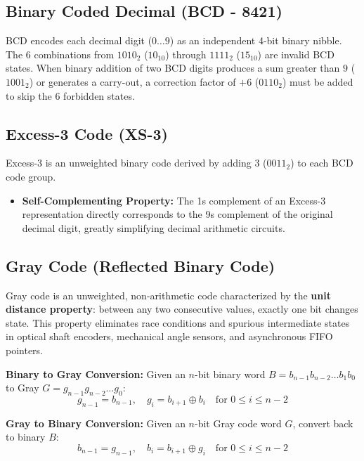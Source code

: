 \subsection{Binary Coded Decimal (BCD - 8421)}
BCD encodes each decimal digit ($0 \dots 9$) as an independent 4-bit binary nibble.
The 6 combinations from $1010_2$ ($10_{10}$) through $1111_2$ ($15_{10}$) are invalid BCD states.
When binary addition of two BCD digits produces a sum greater than $9$ ($1001_2$) or generates a carry-out, a correction factor of $+6$ ($0110_2$) must be added to skip the 6 forbidden states.

\subsection{Excess-3 Code (XS-3)}
Excess-3 is an unweighted binary code derived by adding $3$ ($0011_2$) to each BCD code group.
\begin{itemize}
    \item \textbf{Self-Complementing Property:} The 1\textquotesingle s complement of an Excess-3 representation directly corresponds to the 9\textquotesingle s complement of the original decimal digit, greatly simplifying decimal arithmetic circuits.
\end{itemize}

\subsection{Gray Code (Reflected Binary Code)}
Gray code is an unweighted, non-arithmetic code characterized by the \textbf{unit distance property}: between any two consecutive values, exactly one bit changes state. This property eliminates race conditions and spurious intermediate states in optical shaft encoders, mechanical angle sensors, and asynchronous FIFO pointers.

\begin{derivationbox}
\textbf{Binary to Gray Conversion:}
Given an $n$-bit binary word $B = b_{n-1} b_{n-2} \dots b_1 b_0$ to Gray $G = g_{n-1} g_{n-2} \dots g_0$:
\begin{equation}
g_{n-1} = b_{n-1}, \quad g_i = b_{i+1} \oplus b_i \quad \text{for } 0 \le i \le n-2
\end{equation}

\textbf{Gray to Binary Conversion:}
Given an $n$-bit Gray code word $G$, convert back to binary $B$:
\begin{equation}
b_{n-1} = g_{n-1}, \quad b_i = b_{i+1} \oplus g_i \quad \text{for } 0 \le i \le n-2
\end{equation}
\end{derivationbox}

